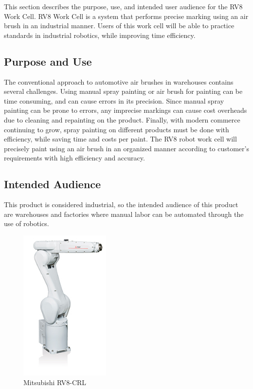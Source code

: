 This section describes the purpose, use, and intended user audience for the RV8 Work Cell. RV8 Work Cell is a system that performs precise marking using an air brush in an industrial manner. Users of this work cell will be able to practice standards in industrial robotics, while improving time efficiency. 
\subsection{Purpose and Use}
The conventional approach to automotive air brushes in warehouses contains several challenges. Using manual spray painting or air brush for painting can be time consuming, and can cause errors in its precision. Since manual spray painting can be prone to errors, any imprecise markings can cause cost overheads due to cleaning and repainting on the product. Finally, with modern commerce continuing to grow, spray painting on different products must be done with efficiency, while saving time and costs per paint. The RV8 robot work cell will precisely paint using an air brush in an organized manner according to customer's requirements with high efficiency and accuracy.

\subsection{Intended Audience}
This product is considered industrial, so the intended audience of this product are warehouses and factories where manual labor can be automated through the use of robotics.

\begin{figure}[h!]
	\centering
   	\includegraphics[width=0.40\textwidth]{images/rv8crl.jpeg}
    \caption{Mitsubishi RV8-CRL  \cite{MitsubishiRV8CRL}}
\end{figure}

